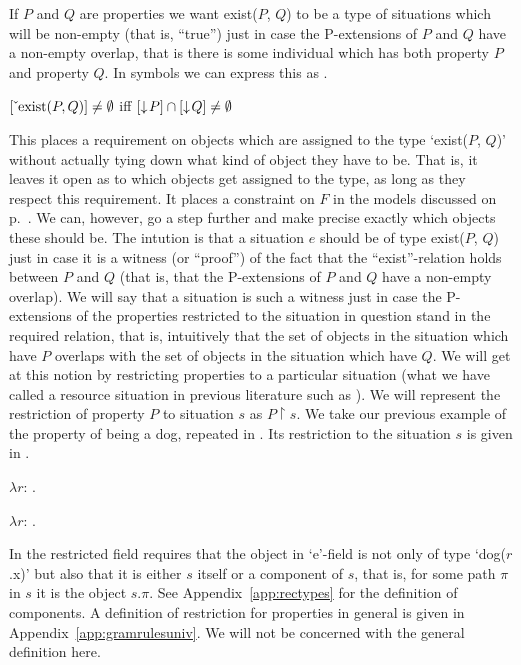 If $P$ and $Q$ are properties we want exist($P$, $Q$)
to be a type of situations which will be non-empty (that is, ``true'')
just in case the P-extensions of $P$ and $Q$ have a non-empty overlap,
that is there is some individual which has both property $P$ and
property $Q$.  In symbols we can express this as \nexteg{}.
\begin{ex} 
$[\ \!\check{}\ \!\mathrm{exist}(P,Q)]\not=\emptyset$ iff
$[\downarrow\!P]\cap[\downarrow\!Q]\not=\emptyset$ 
\label{ex:constraintexist}
\end{ex} 
This places a requirement on objects which are assigned to the type `exist($P$, $Q$)'
without actually tying down what kind of object they have to be.  That
is, it leaves it open as to which objects get assigned to the type, as
long as they respect this requirement.  It places a constraint on $F$
in the models discussed on p.~\pageref{pg:models}.  We can, however,
go a step further and make precise exactly which objects these should
be.  The intution is that a situation $e$ should be of type exist($P$,
$Q$) just in case it is a witness (or ``proof'') of the fact that the
``exist''-relation holds between $P$ and $Q$ (that is, that the
P-extensions of $P$ and $Q$ have a non-empty overlap). We will say
that a situation is such a witness just in case the P-extensions of
the properties restricted to the situation in question stand in the
required relation, that is, intuitively that the set of objects in the
situation which have $P$ overlaps with the set of objects in the
situation which have $Q$.  We will get at this notion by restricting
properties to a particular situation (what we have called a
resource situation in previous literature such as
\citealp{BarwisePerry1983,Cooper1996a}). We will represent the
restriction of property $P$ to situation $s$ as $P\!\restriction\!
s$. We take our previous example of the property of being a dog,
repeated in .  Its restriction to the situation $s$ is given
in .
\begin{ex} 
\begin{subex} 
 
\item $\lambda r$: .  
 
\item $\lambda r$: .  
 
\end{subex} 
   
\end{ex} 
In  the restricted field\label{pg:restfld}
 requires that the
object in `e'-field is not only of type `dog($r$.x)' but also that it
is either $s$ itself or a component of $s$, that is, for some
path $\pi$ in $s$ it is the object $s.\pi$.  See
Appendix~\ref{app:rectypes} for the definition of components.  A definition of restriction for properties in general is given in
Appendix~\ref{app:gramrulesuniv}.  We will not be concerned with the
general definition here.  

